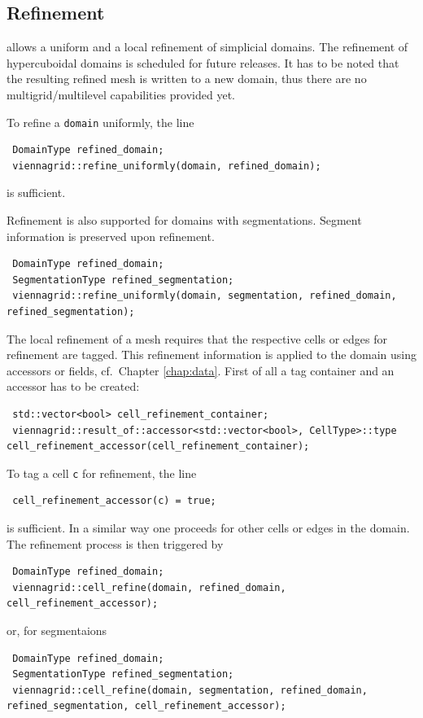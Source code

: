 

 \subsection{Refinement}
 {\ViennaGridversion} allows a uniform and a local refinement of simplicial domains. The refinement of hypercuboidal domains is scheduled for future releases.
It has to be noted that the resulting refined mesh is written to a new domain, thus there are no multigrid/multilevel capabilities provided yet.

 To refine a \lstinline|domain| uniformly, the line
 \begin{lstlisting}
 DomainType refined_domain;
 viennagrid::refine_uniformly(domain, refined_domain);
 \end{lstlisting}
 is sufficient.
 
 Refinement is also supported for domains with segmentations. Segment information is preserved upon refinement.
 \begin{lstlisting}
 DomainType refined_domain;
 SegmentationType refined_segmentation;
 viennagrid::refine_uniformly(domain, segmentation, refined_domain, refined_segmentation);
 \end{lstlisting}

 The local refinement of a mesh requires that the respective cells or edges for refinement are tagged. This refinement information is applied to the domain using accessors or fields, cf.~Chapter \ref{chap:data}.
 First of all a tag container and an accessor has to be created:
 \begin{lstlisting}
 std::vector<bool> cell_refinement_container;
 viennagrid::result_of::accessor<std::vector<bool>, CellType>::type cell_refinement_accessor(cell_refinement_container);
 \end{lstlisting}
 
 
 To tag a cell \lstinline|c| for refinement, the line
 \begin{lstlisting}
 cell_refinement_accessor(c) = true;
 \end{lstlisting}
 is sufficient. In a similar way one proceeds for other cells or edges in the domain. The refinement process is then triggered by
 \begin{lstlisting}
 DomainType refined_domain;
 viennagrid::cell_refine(domain, refined_domain, cell_refinement_accessor);
 \end{lstlisting}
 or, for segmentaions
 \begin{lstlisting}
 DomainType refined_domain;
 SegmentationType refined_segmentation;
 viennagrid::cell_refine(domain, segmentation, refined_domain, refined_segmentation, cell_refinement_accessor);
 \end{lstlisting}

